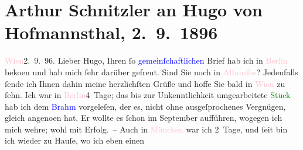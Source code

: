 

               \section[Arthur Schnitzler an Hugo von Hofmannsthal, 2. 9. 1896]{ Arthur Schnitzler an Hugo von Hofmannsthal,
                    2. 9. 1896}\nopagebreak{}\rehead{ }\normalsize\beginnumbering{} \toendnotes[C]{\smallbreak\pagebreak[2]} 
\toendnotes[C]{\smallbreak}\pstart
           \raggedleft{}{\pb}\textcolor{pink}{Wien}{}\ledrightnote{\textcolor{pink}{Wien}}{ }2. 9. 96.\pend
           \pstart{}Lieber Hugo,\pend\pstart
           Ihren ſo \textcolor{blue}{gemeinſchaftlichen}{}
                    Brief hab ich in \textcolor{pink}{Berlin}{}\ledrightnote{\textcolor{pink}{Berlin}} beko{\geminationm}en und hab mich ſehr darüber gefreut. Sind Sie
                    noch in \textcolor{pink}{Altausſee}{}\ledrightnote{\textcolor{pink}{Altaussee}}? Jedenfalls ſende ich Ihnen
                    dahin meine herzlichſten Grüße und hoffe Sie bald in \textcolor{pink}{Wien}{}\ledrightnote{\textcolor{pink}{Wien}} zu ſehn. Ich war in \textcolor{pink}{Berlin}{}\ledrightnote{\textcolor{pink}{Berlin}}{ }{\pb}4 Tage; das bis zur Unkenntlichkeit umgearbeitete
                        \textcolor{green}{Stück}{} hab ich dem \textcolor{blue}{Brahm}{}\ledrightnote{\textcolor{blue}{Otto Brahm}} vorgeleſen, der es, nicht ohne
                    ausgeſprochenes Vergnügen, gleich angeno{\geminationm}en hat. Er
                    wollte es ſchon im September aufführen, wogegen ich mich wehre;
                    wohl mit Erfolg. –\pend
           \pstart
           Auch in \textcolor{pink}{München}{}\ledrightnote{\textcolor{pink}{München}} war ich 2 Tage, und ſeit
                        \label{K_L00582_1v}\label{K_L00582_1h} bin ich wieder zu Hauſe, wo ich eben einen
